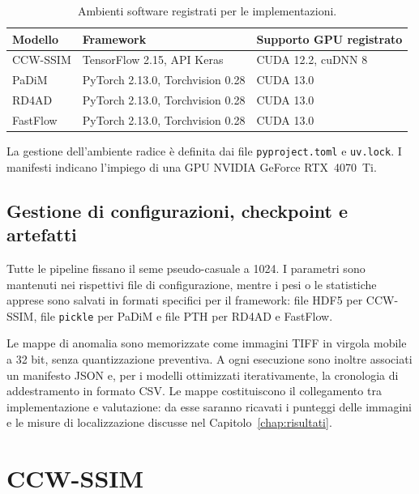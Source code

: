 \begin{table}[htbp]
    \centering
    \small
    \begin{tabularx}{\textwidth}{|P{2.3cm}|Y|Y|}
        \hline
        \textbf{Modello} & \textbf{Framework} & \textbf{Supporto GPU registrato} \\
        \hline
        CCW-SSIM & TensorFlow 2.15, API Keras & CUDA 12.2, cuDNN 8 \\
        \hline
        PaDiM & PyTorch 2.13.0, Torchvision 0.28 & CUDA 13.0 \\
        \hline
        RD4AD & PyTorch 2.13.0, Torchvision 0.28 & CUDA 13.0 \\
        \hline
        FastFlow & PyTorch 2.13.0, Torchvision 0.28 & CUDA 13.0 \\
        \hline
    \end{tabularx}
    \caption{Ambienti software registrati per le implementazioni.}
    \label{tab:cap3-ambienti}
\end{table}

La gestione dell'ambiente radice è definita dai file \texttt{pyproject.toml} e \texttt{uv.lock}. I manifesti indicano l'impiego di una GPU NVIDIA GeForce RTX~4070~Ti.

\subsection{Gestione di configurazioni, checkpoint e artefatti}

Tutte le pipeline fissano il seme pseudo-casuale a 1024. I parametri sono mantenuti nei rispettivi file di configurazione, mentre i pesi o le statistiche apprese sono salvati in formati specifici per il framework: file HDF5 per CCW-SSIM, file \texttt{pickle} per PaDiM e file PTH per RD4AD e FastFlow.

Le mappe di anomalia sono memorizzate come immagini TIFF in virgola mobile a 32 bit, senza quantizzazione preventiva. A ogni esecuzione sono inoltre associati un manifesto JSON e, per i modelli ottimizzati iterativamente, la cronologia di addestramento in formato CSV. Le mappe costituiscono il collegamento tra implementazione e valutazione: da esse saranno ricavati i punteggi delle immagini e le misure di localizzazione discusse nel Capitolo~\ref{chap:risultati}.

\section{CCW-SSIM}
\label{sec:cap3-ccw}

